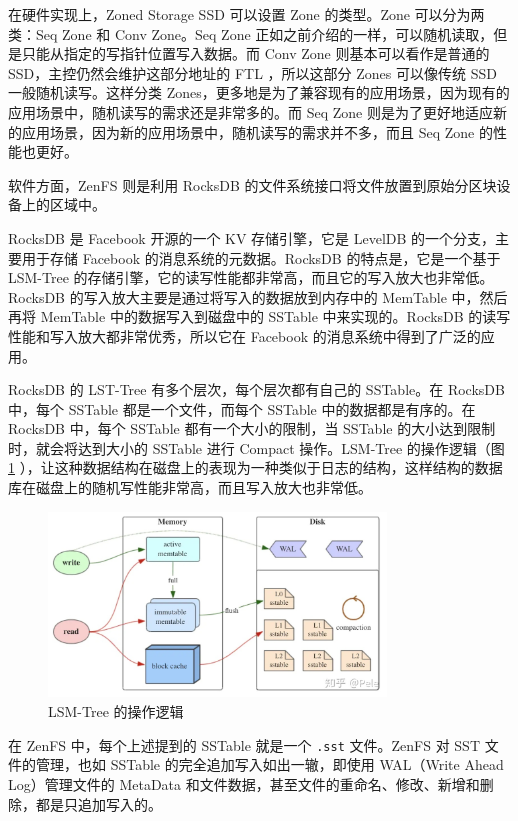 \label{zone-type}

在硬件实现上，Zoned Storage SSD 可以设置 Zone 的类型。Zone 可以分为两类：Seq Zone 和 Conv Zone。Seq Zone 正如之前介绍的一样，可以随机读取，但是只能从指定的写指针位置写入数据。而 Conv Zone 则基本可以看作是普通的 SSD，主控仍然会维护这部分地址的 FTL ，所以这部分 Zones 可以像传统 SSD 一般随机读写。这样分类 Zones，更多地是为了兼容现有的应用场景，因为现有的应用场景中，随机读写的需求还是非常多的。而 Seq Zone 则是为了更好地适应新的应用场景，因为新的应用场景中，随机读写的需求并不多，而且 Seq Zone 的性能也更好。

软件方面，ZenFS 则是利用 RocksDB 的文件系统接口将文件放置到原始分区块设备上的区域中。

RocksDB 是 Facebook 开源的一个 KV 存储引擎，它是 LevelDB 的一个分支，主要用于存储 Facebook 的消息系统的元数据。RocksDB 的特点是，它是一个基于 LSM-Tree 的存储引擎，它的读写性能都非常高，而且它的写入放大也非常低。RocksDB 的写入放大主要是通过将写入的数据放到内存中的 MemTable 中，然后再将 MemTable 中的数据写入到磁盘中的 SSTable 中来实现的。RocksDB 的读写性能和写入放大都非常优秀，所以它在 Facebook 的消息系统中得到了广泛的应用。

RocksDB 的 LST-Tree 有多个层次，每个层次都有自己的 SSTable。在 RocksDB 中，每个 SSTable 都是一个文件，而每个 SSTable 中的数据都是有序的。在 RocksDB 中，每个 SSTable 都有一个大小的限制，当 SSTable 的大小达到限制时，就会将达到大小的 SSTable 进行 Compact 操作。LSM-Tree 的操作逻辑（图 \ref{lsm-tree} ），让这种数据结构在磁盘上的表现为一种类似于日志的结构，这样结构的数据库在磁盘上的随机写性能非常高，而且写入放大也非常低。

\begin{figure}[htbp]
    \centering
    \includegraphics[width=0.8\textwidth]{fig/lsm-tree}
    \caption{LSM-Tree 的操作逻辑}
    \label{lsm-tree}
\end{figure}

在 ZenFS 中，每个上述提到的 SSTable 就是一个 \verb|.sst| 文件。ZenFS 对 SST 文件的管理，也如 SSTable 的完全追加写入如出一辙，即使用 WAL（Write Ahead Log）管理文件的 MetaData 和文件数据，甚至文件的重命名、修改、新增和删除，都是只追加写入的。

